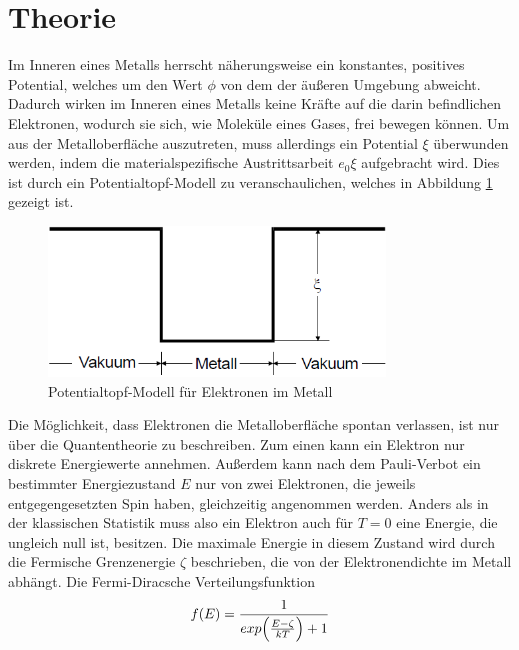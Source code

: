 \section{Theorie}
\label{sec:Theorie}
Im Inneren eines Metalls herrscht näherungsweise ein konstantes, positives Potential, welches um den Wert $\phi$
von dem der äußeren Umgebung abweicht. Dadurch wirken im Inneren eines Metalls keine Kräfte auf die darin 
befindlichen Elektronen, wodurch sie sich, wie Moleküle eines Gases, frei bewegen können. Um aus der Metalloberfläche
auszutreten, muss allerdings ein Potential $\xi $ überwunden werden, indem die materialspezifische Austrittsarbeit
$ e_0\xi$ aufgebracht wird. Dies ist durch ein Potentialtopf-Modell zu veranschaulichen, welches in Abbildung \ref{fig:pottopf}
gezeigt ist. 
 \begin{figure}
     \centering
     \includegraphics[height=4cm]{data/pottopf.png}
     \caption{Potentialtopf-Modell für Elektronen im Metall}
     \label{fig:pottopf}
 \end{figure}
\FloatBarrier
Die Möglichkeit, dass Elektronen die Metalloberfläche spontan verlassen, ist nur über die Quantentheorie zu beschreiben.
Zum einen kann ein Elektron nur diskrete Energiewerte annehmen. Außerdem kann nach dem Pauli-Verbot ein bestimmter Energiezustand $E$ nur von zwei 
Elektronen, die jeweils entgegengesetzten Spin haben, gleichzeitig angenommen werden. Anders als in der klassischen Statistik muss also ein Elektron
auch für $T=0$ eine Energie, die ungleich null ist, besitzen. Die maximale Energie in diesem Zustand wird durch die Fermische Grenzenergie $\zeta$
beschrieben, die von der Elektronendichte im Metall abhängt. 
Die Fermi-Diracsche Verteilungsfunktion
\begin{equation}
    f(E) = \frac{1}{exp \Bigl(\frac{E-\zeta}{kT}\Bigr) +1}
\end{equation}

